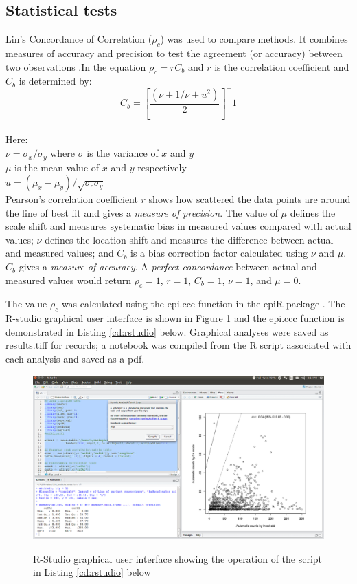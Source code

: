 \subsection{Statistical tests}\label{sec:statistical-data-analyses}
Lin's Concordance of Correlation ($ \rho_c $) was used to compare methods. It combines measures of accuracy and precision to test the agreement (or accuracy) between two observations \cite{Lin1989}.In the equation $ \rho_c = rC_b $ and $ r $ is the correlation coefficient and $ C_b $ is determined by:
\[ C_b = [\dfrac{(\nu + 1/\nu + u^{2})}{2}]^-1 \] \\
Here:\\
$ \nu = \sigma_{x} /\sigma_{y} $ where $\sigma $ is the variance of $x$ and $y$\\
$ \mu $ is the mean value of $ x $ and $ y $ respectively \\
$ u = (\mu_{x}-\mu_{y})/\sqrt{\sigma_{c}\sigma_{y}} $ \\

Pearson's correlation coefficient $r$ shows how scattered the data points are around the line of best fit and gives a \emph{measure of precision}. The value of $ \mu $ defines the scale shift and measures systematic bias in measured values compared with actual values; $ \nu $ defines the location shift and measures the difference between actual and measured values; and $ C_{b} $ is a bias correction factor calculated using $ \nu $ and $ \mu $. $ C_{b} $ gives a \emph{measure of accuracy}. A \emph{perfect concordance} between actual and measured values would return $\rho_{c}= 1$, $r = 1$, $C_{b} = 1$, $\nu  = 1$, and $\mu = 0$. 

The value $ \rho_c $ was calculated using the epi.ccc function in the epiR package \cite{stevenson2012}. The R-studio graphical user interface is shown in Figure \ref{fig:rstudio} and the epi.ccc function is demonstrated in Listing \ref{cd:rstudio} below. Graphical analyses were saved as results.tiff for records; a notebook was compiled from the R script associated with each analysis and saved as a pdf.

\begin{figure}[!htbp]\myfloatalign
\includegraphics[width=1\linewidth]{gfx5/ctest/rstudio} \\
\caption[R-Studio interface for statistical analysis.]{R-Studio graphical user interface showing the operation of the script in Listing \ref{cd:rstudio} below}\label{fig:rstudio}
\end{figure}

